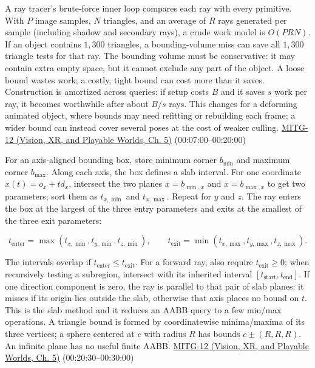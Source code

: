 A ray tracer's brute-force inner loop compares each ray with every primitive. With \(P\) image samples, \(N\) triangles, and an average of \(R\) rays generated per sample (including shadow and secondary rays), a crude work model is \(O(PRN)\). If an object contains \(1{,}300\) triangles, a bounding-volume miss can save all \(1{,}300\) triangle tests for that ray. The bounding volume must be conservative: it may contain extra empty space, but it cannot exclude any part of the object. A loose bound wastes work; a costly, tight bound can cost more than it saves. Construction is amortized across queries: if setup costs \(B\) and it saves \(s\) work per ray, it becomes worthwhile after about \(B/s\) rays. This changes for a deforming animated object, where bounds may need refitting or rebuilding each frame; a wider bound can instead cover several poses at the cost of weaker culling. \href{../07-Vision-XR-and-Playable-Worlds/main.pdf\#nameddest=04-visual-computing-ii-ch036-mitg-12---ray-tracing-ii}{MITG-12 (Vision, XR, and Playable Worlds, Ch. 5)} (00:07:00--00:20:00)

For an axis-aligned bounding box, store minimum corner \(b_{\min}\) and maximum corner \(b_{\max}\). Along each axis, the box defines a slab interval. For one coordinate \(x(t)=o_x+td_x\), intersect the two planes \(x=b_{\min,x}\) and \(x=b_{\max,x}\) to get two parameters; sort them as \(t_{x,\min}\) and \(t_{x,\max}\). Repeat for \(y\) and \(z\). The ray enters the box at the largest of the three entry parameters and exits at the smallest of the three exit parameters:

\[
t_{\mathrm{enter}}=\max(t_{x,\min},t_{y,\min},t_{z,\min}),\qquad
t_{\mathrm{exit}}=\min(t_{x,\max},t_{y,\max},t_{z,\max}).
\]

The intervals overlap if \(t_{\mathrm{enter}}\leq t_{\mathrm{exit}}\). For a forward ray, also require \(t_{\mathrm{exit}}\geq0\); when recursively testing a subregion, intersect with its inherited interval \([t_{\mathrm{start}},t_{\mathrm{end}}]\). If one direction component is zero, the ray is parallel to that pair of slab planes: it misses if its origin lies outside the slab, otherwise that axis places no bound on \(t\). This is the slab method and it reduces an AABB query to a few min/max operations. A triangle bound is formed by coordinatewise minima/maxima of its three vertices; a sphere centered at \(c\) with radius \(R\) has bounds \(c\pm(R,R,R)\). An infinite plane has no useful finite AABB. \href{../07-Vision-XR-and-Playable-Worlds/main.pdf\#nameddest=04-visual-computing-ii-ch036-mitg-12---ray-tracing-ii}{MITG-12 (Vision, XR, and Playable Worlds, Ch. 5)} (00:20:30--00:30:00)

